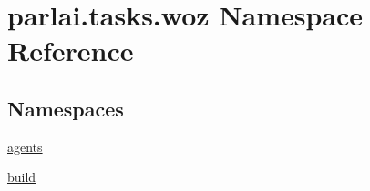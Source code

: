 \hypertarget{namespaceparlai_1_1tasks_1_1woz}{}\section{parlai.\+tasks.\+woz Namespace Reference}
\label{namespaceparlai_1_1tasks_1_1woz}
\subsection*{Namespaces}
\begin{DoxyCompactItemize}
\item 
 \hyperlink{namespaceparlai_1_1tasks_1_1woz_1_1agents}{agents}
\item 
 \hyperlink{namespaceparlai_1_1tasks_1_1woz_1_1build}{build}
\end{DoxyCompactItemize}
